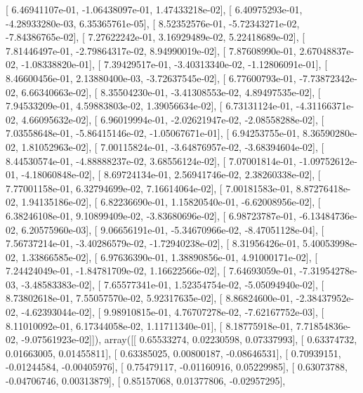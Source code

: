 \documentclass{article}
\begin{document}
       [  6.46941107e-01,  -1.06438097e-01,   1.47433218e-02],
       [  6.40975293e-01,  -4.28933280e-03,   6.35365761e-05],
       [  8.52352576e-01,  -5.72343271e-02,  -7.84386765e-02],
       [  7.27622242e-01,   3.16929489e-02,   5.22418689e-02],
       [  7.81446497e-01,  -2.79864317e-02,   8.94990019e-02],
       [  7.87608990e-01,   2.67048837e-02,  -1.08338820e-01],
       [  7.39429517e-01,  -3.40313340e-02,  -1.12806091e-01],
       [  8.46600456e-01,   2.13880400e-03,  -3.72637545e-02],
       [  6.77600793e-01,  -7.73872342e-02,   6.66340663e-02],
       [  8.35504230e-01,  -3.41308553e-02,   4.89497535e-02],
       [  7.94533209e-01,   4.59883803e-02,   1.39056634e-02],
       [  6.73131124e-01,  -4.31166371e-02,   4.66095632e-02],
       [  6.96019994e-01,  -2.02621947e-02,  -2.08558288e-02],
       [  7.03558648e-01,  -5.86415146e-02,  -1.05067671e-01],
       [  6.94253755e-01,   8.36590280e-02,   1.81052963e-02],
       [  7.00115824e-01,  -3.64876957e-02,  -3.68394604e-02],
       [  8.44530574e-01,  -4.88888237e-02,   3.68556124e-02],
       [  7.07001814e-01,  -1.09752612e-01,  -4.18060848e-02],
       [  8.69724134e-01,   2.56941746e-02,   2.38260338e-02],
       [  7.77001158e-01,   6.32794699e-02,   7.16614064e-02],
       [  7.00181583e-01,   8.87276418e-02,   1.94135186e-02],
       [  6.82236690e-01,   1.15820540e-01,  -6.62008956e-02],
       [  6.38246108e-01,   9.10899409e-02,  -3.83680696e-02],
       [  6.98723787e-01,  -6.13484736e-02,   6.20575960e-03],
       [  9.06656191e-01,  -5.34670966e-02,  -8.47051128e-04],
       [  7.56737214e-01,  -3.40286579e-02,  -1.72940238e-02],
       [  8.31956426e-01,   5.40053998e-02,   1.33866585e-02],
       [  6.97636390e-01,   1.38890856e-01,   4.91000171e-02],
       [  7.24424049e-01,  -1.84781709e-02,   1.16622566e-02],
       [  7.64693059e-01,  -7.31954278e-03,  -3.48583383e-02],
       [  7.65577341e-01,   1.52354754e-02,  -5.05094940e-02],
       [  8.73802618e-01,   7.55057570e-02,   5.92317635e-02],
       [  8.86824600e-01,  -2.38437952e-02,  -4.62393044e-02],
       [  9.98910815e-01,   4.76707278e-02,  -7.62167752e-03],
       [  8.11010092e-01,   6.17344058e-02,   1.11711340e-01],
       [  8.18775918e-01,   7.71854836e-02,  -9.07561923e-02]]), array([[ 0.65533274,  0.02230598,  0.07337993],
       [ 0.63374732,  0.01663005,  0.01455811],
       [ 0.63385025,  0.00800187, -0.08646531],
       [ 0.70939151, -0.01244584, -0.00405976],
       [ 0.75479117, -0.01160916,  0.05229985],
       [ 0.63073788, -0.04706746,  0.00313879],
       [ 0.85157068,  0.01377806, -0.02957295],
\end{document}
